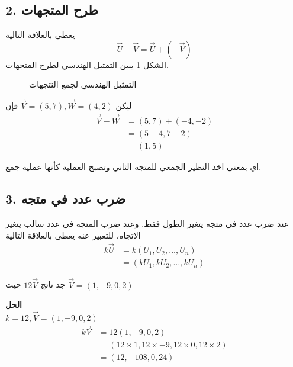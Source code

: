 \subsection*{2. طرح المتجهات}
يعطى بالعلاقة التالية
\[
\vec{U} - \vec{V} = \vec{U} + (-\vec{V})
\]
الشكل \ref{fig:vecdiff} يبين التمثيل الهندسي لطرح المتجهات.
	\begin{figure}[ht]
	\centering
	\caption{التمثيل الهندسي لجمع النتجهات}
	\label{fig:vecdiff}
\end{figure}

\begin{example}
	ليكن
	$\vec{V}=(5, 7), \vec{W} = (4,2)$
	فإن 
	\begin{align*}
		\vec{V}-\vec{W} &= (5,7) + (-4, -2)\\
		&= (5-4, 7-2)\\
		&= (1,5)
	\end{align*}
\end{example}
\noindent
اي بمعنى اخذ النظير الجمعي للمتجه الثاني وتصبح العملية كأنها عملية جمع.

\subsection*{3. ضرب عدد في متجه}
عند ضرب عدد في متجه يتغير الطول فقط. وعند ضرب المتجه في عدد سالب يتغير الاتجاه، للتعبير عنه يعطى بالعلاقة التالية
\begin{align*}
	k \vec{U} &= k(U_1, U_2, \dots, U_n)\\
	&= (kU_1, kU_2, \dots, kU_n)
\end{align*}

\begin{example}
	جد ناتج $12\vec{V}$ حيث $\vec{V}=(1,-9,0,2)$
\end{example}
\noindent
\textbf{الحل}\\
\noindent
$k=12, \vec{V}=(1,-9,0,2)$
\begin{align*}
	k\vec{V} &= 12(1,-9,0,2)\\
	&= (12\times1, 12\times-9, 12\times0, 12\times2)\\
	&= (12, -108, 0, 24)
\end{align*}

